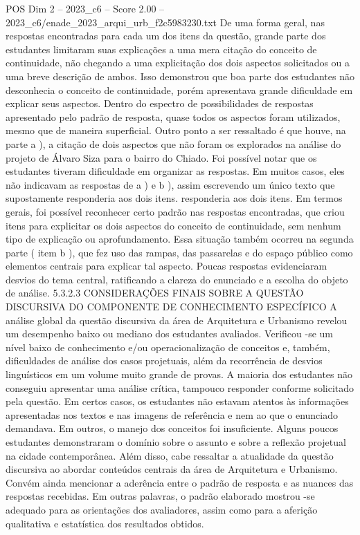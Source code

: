\begin{textsample}{POS Dim 2 – 2023\_c6 – Score 2.00 – 2023\_c6/enade\_2023\_arqui\_urb\_f2c5983230.txt}
De uma forma geral, nas respostas encontradas para cada um dos itens da questão, grande parte dos estudantes limitaram suas explicações a uma mera citação do conceito de continuidade, não chegando a uma explicitação dos dois aspectos solicitados ou a uma breve descrição de ambos.
Isso demonstrou que boa parte dos estudantes não desconhecia o conceito de continuidade, porém apresentava grande dificuldade em explicar seus aspectos.
Dentro do espectro de possibilidades de respostas apresentado pelo padrão de resposta, quase todos os aspectos foram utilizados, mesmo que de maneira superficial.
Outro ponto a ser ressaltado é que houve, na parte a ), a citação de dois aspectos que não foram os explorados na análise do projeto de Álvaro Siza para o bairro do Chiado.
Foi possível notar que os estudantes tiveram dificuldade em organizar as respostas.
Em muitos casos, eles não indicavam as respostas de a ) e b ), assim escrevendo um único texto que supostamente responderia aos dois itens. responderia aos dois itens.
Em termos gerais, foi possível reconhecer certo padrão nas respostas encontradas, que criou itens para explicitar os dois aspectos do conceito de continuidade, sem nenhum tipo de explicação ou aprofundamento.
Essa situação também ocorreu na segunda parte ( item b ), que fez uso das rampas, das passarelas e do espaço público como elementos centrais para explicar tal aspecto.
Poucas respostas evidenciaram desvios do tema central, ratificando a clareza do enunciado e a escolha do objeto de análise. 5.3.2.3 CONSIDERAÇÕES FINAIS SOBRE A QUESTÃO DISCURSIVA DO COMPONENTE DE CONHECIMENTO ESPECÍFICO A análise global da questão discursiva da área de Arquitetura e Urbanismo revelou um desempenho baixo ou mediano dos estudantes avaliados.
Verificou -se um nível baixo de conhecimento e/ou operacionalização de conceitos e, também, dificuldades de análise dos casos projetuais, além da recorrência de desvios linguísticos em um volume muito grande de provas.
A maioria dos estudantes não conseguiu apresentar uma análise crítica, tampouco responder conforme solicitado pela questão.
Em certos casos, os estudantes não estavam atentos às informações apresentadas nos textos e nas imagens de referência e nem ao que o enunciado demandava.
Em outros, o manejo dos conceitos foi insuficiente.
Alguns poucos estudantes demonstraram o domínio sobre o assunto e sobre a reflexão projetual na cidade contemporânea.
Além disso, cabe ressaltar a atualidade da questão discursiva ao abordar conteúdos centrais da área de Arquitetura e Urbanismo.
Convém ainda mencionar a aderência entre o padrão de resposta e as nuances das respostas recebidas.
Em outras palavras, o padrão elaborado mostrou -se adequado para as orientações dos avaliadores, assim como para a aferição qualitativa e estatística dos resultados obtidos.

\end{textsample}

